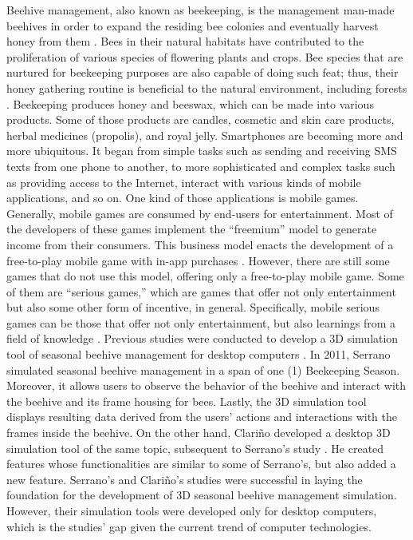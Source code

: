 \documentclass[journal]{./IEEE/IEEEtran}
\begin{document}
\indent Beehive management, also known as beekeeping, is the management man-made beehives in order to expand the residing bee colonies and eventually harvest honey from them \cite{bradbear}. Bees in their natural habitats have contributed to the proliferation of various species of flowering plants and crops. Bee species that are nurtured for beekeeping purposes are also capable of doing such feat; thus, their honey gathering routine is beneficial to the natural environment, including forests \cite{agera}. Beekeeping produces honey and beeswax, which can be made into various products. Some of those products are candles, cosmetic and skin care products, herbal medicines (propolis), and royal jelly.
\newline
\indent Smartphones are becoming more and more ubiquitous. It began from simple tasks such as sending and receiving SMS texts from one phone to another, to more sophisticated and complex tasks such as providing access to the Internet, interact with various kinds of mobile applications, and so on. One kind of those applications is mobile games.
\newline
\indent Generally, mobile games are consumed by end-users for entertainment. Most of the developers of these games implement the “freemium” model to generate income from their consumers. This business model enacts the development of a free-to-play mobile game with in-app purchases \cite{heier}. However, there are still some games that do not use this model, offering only a free-to-play mobile game. Some of them are “serious games,” which are games that offer not only entertainment but also some other form of incentive, in general.  Specifically, mobile serious games can be those that offer not only entertainment, but also learnings from a field of knowledge \cite{sugimuraetal}.
\newline
\pubidadjcol
\indent Previous studies were conducted to develop a 3D simulation tool of seasonal beehive management for desktop computers \cite{serrano}\cite{clarino}. In 2011, Serrano simulated seasonal beehive management in a span of one (1) Beekeeping Season. Moreover, it allows users to observe the behavior of the beehive and interact with the beehive and its frame housing for bees. Lastly, the 3D simulation tool displays resulting data derived from the users{'} actions and interactions with the frames inside the beehive. On the other hand, Clari\~{n}o developed a desktop 3D simulation tool of the same topic, subsequent to Serrano{'}s study \cite{clarino}. He created features whose functionalities are similar to some of Serrano{'}s, but also added a new feature.
\newline 
\indent Serrano{'}s and Clari\~{n}o{'}s studies were successful in laying the foundation for the development of 3D seasonal beehive management simulation. However, their simulation tools were developed only for desktop computers, which is the studies’ gap given the current trend of computer technologies.
\end{document}
